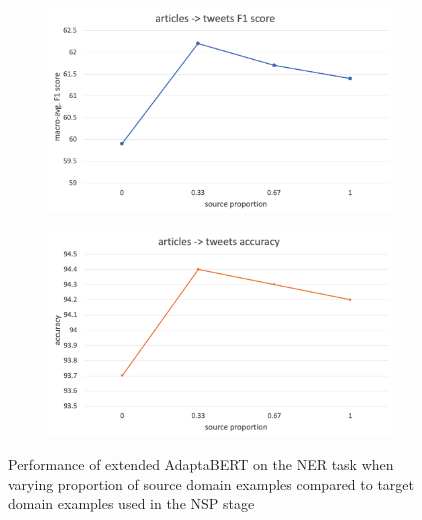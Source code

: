\begin{figure}[ht]
    \centering
    \begin{subfigure}{\textwidth}
        \centering
        \includegraphics[scale=0.28]{0-img/nsp-ner-src-proportion-f1.png}
    \end{subfigure}
    \begin{subfigure}{\textwidth}
        \centering
        \includegraphics[scale=0.28]{0-img/nsp-ner-src-proportion-accuracy.png}
    \end{subfigure}
    \caption{Performance of extended AdaptaBERT on the NER task when varying proportion of source domain examples compared to target domain examples used in the NSP stage}
    \label{fig:nsp-ner-src-proportion}
\end{figure}

